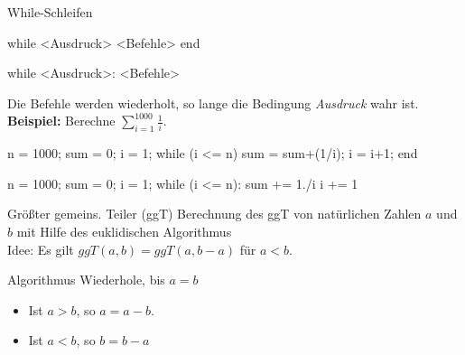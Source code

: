 \documentclass[hyperref={xetex}]{beamer}
\begin{document}
%
%
%
\begin{frame}[fragile]{While-Schleifen}
\begin{matlabin}
while <Ausdruck>
  <Befehle>
end
\end{matlabin}
\begin{pyin}
while <Ausdruck>:
  <Befehle>
\end{pyin}
Die Befehle werden wiederholt,  so lange die Bedingung {\it Ausdruck}
wahr ist.  \\

\textbf{Beispiel:} Berechne \alert{ $\sum_{i=1}^{1000} \frac{1}{i}$}.
\begin{matlabin}
n = 1000; sum = 0; i = 1; 
while (i <= n) 
  sum = sum+(1/i); 
  i = i+1;  
end
\end{matlabin}
\begin{pyin}
n = 1000; sum = 0; i = 1;
while (i <= n):
  sum += 1./i
  i += 1
\end{pyin}

\end{frame}
%
%
%
\begin{frame}[fragile]{Größter gemeins. Teiler (ggT)}
Berechnung des ggT von natürlichen Zahlen $a$ und $b$ mit Hilfe des
euklidischen Algorithmus\\[1cm]

\alert{Idee:} Es gilt \alert{ $ggT(a,b)=ggT(a,b-a)$} für $a<b$.\\[1cm]

\begin{block}{Algorithmus}
Wiederhole,  bis $a=b$
\begin{itemize}
\item Ist $a>b$, so $a=a-b$.
\item Ist $a<b$, so $b=b-a$ 
\end{itemize}
\end{block}
\end{frame}
\end{document}

